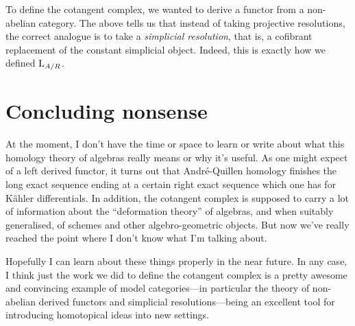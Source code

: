 To define the cotangent complex, we wanted to derive a functor from a
non-abelian category. The above tells us that instead of taking
projective resolutions, the correct analogue is to take a
\emph{simplicial resolution}, that is, a cofibrant replacement of the
constant simplicial object. Indeed, this is exactly how we defined
$\mathrm{L}_{A/R}$.


\section*{Concluding nonsense}

At the moment, I don't have the time or space to learn or write about
what this homology theory of algebras really means or why it's
useful. As one might expect of a left derived functor, it turns out
that Andr\'e-Quillen homology finishes the long exact sequence ending
at a certain right exact sequence which one has for K\"ahler
differentials. In addition, the cotangent complex is supposed to carry
a lot of information about the ``deformation theory'' of algebras, and
when suitably generalised, of schemes and other algebro-geometric
objects. But now we've really reached the point where I don't know
what I'm talking about.

Hopefully I can learn about these things properly in the near
future. In any case, I think just the work we did to define the
cotangent complex is a pretty awesome and convincing example of model
categories---in particular the theory of non-abelian derived functors
and simplicial resolutions---being an excellent tool for introducing
homotopical ideas into new settings.


\nocite{iyengar-cotangent}




